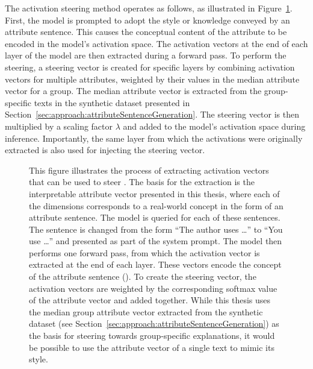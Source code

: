 The activation steering method operates as follows, as illustrated in Figure~\ref{fig:activationSteering}. First, the model is prompted to adopt the style or knowledge conveyed by an attribute sentence. This causes the conceptual content of the attribute to be encoded in the model's activation space. The activation vectors at the end of each layer of the model are then extracted during a forward pass. To perform the steering, a steering vector is created for specific layers by combining activation vectors for multiple attributes, weighted by their values in the median attribute vector for a group. The median attribute vector is extracted from the group-specific texts in the synthetic dataset presented in Section~\ref{sec:approach:attributeSentenceGeneration}. The steering vector is then multiplied by a scaling factor \(\lambda\) and added to the model's activation space during inference. Importantly, the same layer from which the activations were originally extracted is also used for injecting the steering vector.


\begin{figure}[hb]
  \centering
  \scalebox{0.95}{
    
  }
  \caption{This figure illustrates the process of extracting activation vectors that can be used to steer . The basis for the extraction is the interpretable attribute vector presented in this thesis, where each of the dimensions corresponds to a real-world concept in the form of an attribute sentence. The model is queried for each of these sentences. The sentence is changed from the form \enquote{The author uses \ldots} to \enquote{You use \ldots} and presented as part of the system prompt. The model then performs one forward pass, from which the activation vector is extracted at the end of each layer. These vectors encode the concept of the attribute sentence (\cite{konenStyleVectorsSteering2024,turnerActivationAdditionSteering2024,rimsky-etal-2024-steering}). To create the steering vector, the activation vectors are weighted by the corresponding softmax value of the attribute vector and added together. While this thesis uses the median group attribute vector extracted from the synthetic dataset (see Section~\ref{sec:approach:attributeSentenceGeneration}) as the basis for steering towards group-specific explanations, it would be possible to use the attribute vector of a single text to mimic its style.}%
  \label{fig:activationSteering}
\end{figure}
